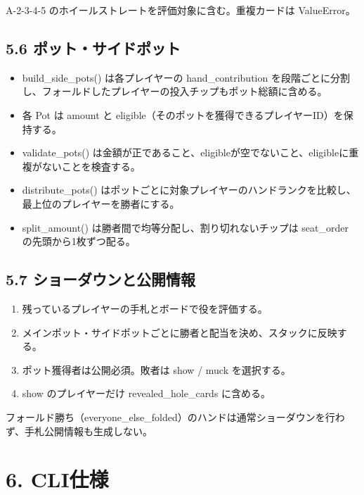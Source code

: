 \documentclass[
]{article}
\begin{document}
A-2-3-4-5 のホイールストレートを評価対象に含む。重複カードは
ValueError。

\subsection{5.6
ポット・サイドポット}\label{ux30ddux30c3ux30c8ux30b5ux30a4ux30c9ux30ddux30c3ux30c8}

\begin{itemize}
\item
  build\_side\_pots() は各プレイヤーの hand\_contribution
  を段階ごとに分割し、フォールドしたプレイヤーの投入チップもポット総額に含める。
\item
  各 Pot は amount と
  eligible（そのポットを獲得できるプレイヤーID）を保持する。
\item
  validate\_pots()
  は金額が正であること、eligibleが空でないこと、eligibleに重複がないことを検査する。
\item
  distribute\_pots()
  はポットごとに対象プレイヤーのハンドランクを比較し、最上位のプレイヤーを勝者にする。
\item
  split\_amount() は勝者間で均等分配し、割り切れないチップは seat\_order
  の先頭から1枚ずつ配る。
\end{itemize}

\subsection{5.7
ショーダウンと公開情報}\label{ux30b7ux30e7ux30fcux30c0ux30a6ux30f3ux3068ux516cux958bux60c5ux5831}

\begin{enumerate}
\def\labelenumi{\arabic{enumi}.}
\item
  残っているプレイヤーの手札とボードで役を評価する。
\item
  メインポット・サイドポットごとに勝者と配当を決め、スタックに反映する。
\item
  ポット獲得者は公開必須。敗者は show / muck を選択する。
\item
  show のプレイヤーだけ revealed\_hole\_cards に含める。
\end{enumerate}

フォールド勝ち（everyone\_else\_folded）のハンドは通常ショーダウンを行わず、手札公開情報も生成しない。

\section{6. CLI仕様}\label{cliux4ed5ux69d8}
\end{document}
